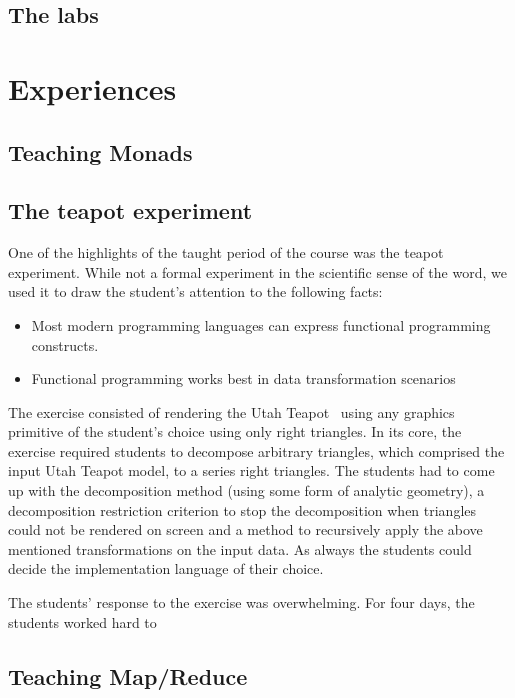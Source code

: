 \documentclass[conference]{IEEEtran}
\begin{document}
\subsection{The labs}



\section{Experiences}

\subsection{Teaching Monads}

\subsection{The teapot experiment}

One of the highlights of the taught period of the course was the teapot
experiment. While not a formal experiment in the scientific sense of the word,
we used it to draw the student's attention to the following facts:

\begin{itemize}

  \item Most modern programming languages can express functional programming
    constructs.

  \item Functional programming works best in data transformation scenarios

\end{itemize}

The exercise consisted of rendering the Utah Teapot~\cite{Torre06} using any
graphics primitive of the student's choice using only right triangles.  In its
core, the exercise required students to decompose arbitrary triangles, which
comprised the input Utah Teapot model, to a series right triangles.  The
students had to come up with the decomposition method (using some form of
analytic geometry), a decomposition restriction criterion to stop the
decomposition when triangles could not be rendered on screen and a method to
recursively apply the above mentioned transformations on the input data. As
always the students could decide the implementation language of their choice.

The students' response to the exercise was overwhelming. For four days,
the students worked hard to 

\subsection{Teaching Map/Reduce}
\end{document}
